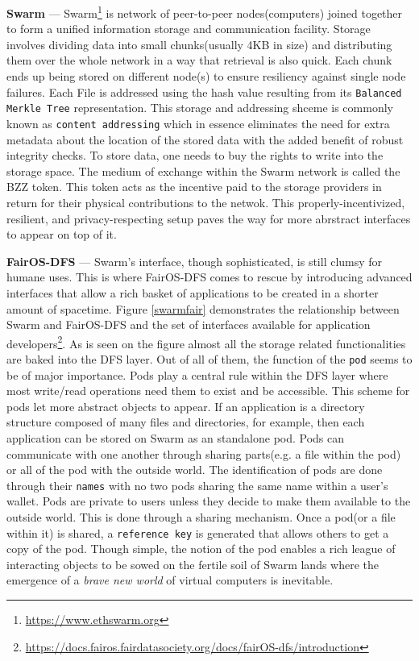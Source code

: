 \documentclass[a4paper, 10pt]{article}
\begin{document}
\textbf{Swarm} --- Swarm\footnote{\url{https://www.ethswarm.org}} is network of peer-to-peer nodes(computers) joined together to form a unified  information storage and communication facility. Storage involves dividing data into small chunks(usually 4KB in size) and distributing them over the whole network in a way that retrieval is also quick. Each chunk ends up being stored on different node(s) to ensure resiliency against single node failures. Each File is addressed using the hash value resulting from its \texttt{Balanced Merkle Tree} representation. This storage and addressing shceme is commonly known as \texttt{content addressing} which in essence eliminates the need for extra metadata about the location of the stored data with the added benefit of robust integrity checks. To store data, one needs to buy the rights to write into the storage space. The medium of exchange within the Swarm network is called the BZZ token. This token acts as the incentive paid to the storage providers in return for their physical contributions to the netwok. This properly-incentivized, resilient, and privacy-respecting setup paves the way for more abrstract interfaces to appear on top of it.
\par
\textbf{FairOS-DFS} --- Swarm's interface, though sophisticated, is still clumsy for humane uses. This is where FairOS-DFS comes to rescue by introducing advanced interfaces that allow a rich basket of applications to be created in a shorter amount of spacetime. Figure  \ref{swarmfair} demonstrates the relationship between Swarm and FairOS-DFS and the set of interfaces available for application developers\footnote{\url{https://docs.fairos.fairdatasociety.org/docs/fairOS-dfs/introduction}}. As is seen on the figure almost all the storage related functionalities are baked into the DFS layer. Out of all of them, the function of the \texttt{pod} seems to be of major importance. Pods play a central rule within the DFS layer where most write/read operations need them to exist and be accessible. This scheme for pods let more abstract objects to appear. If an application is a directory structure composed of many files and directories, for example, then each application can be stored on Swarm as an standalone pod. Pods can communicate with one another through sharing parts(e.g. a file within the pod) or all of the pod with the outside world. The identification of pods are done through their \texttt{names} with no two pods sharing the same name within a user's wallet. Pods are private to users unless they decide to make them available to the outside world. This is done through a sharing mechanism. Once a pod(or a file within it) is shared, a \texttt{reference key} is generated that allows others to get a copy of the pod. Though simple, the notion of the pod enables a rich league of interacting objects to be sowed on the fertile soil of Swarm lands where the emergence of a \textit{brave new world} of virtual computers is inevitable.
\end{document}
